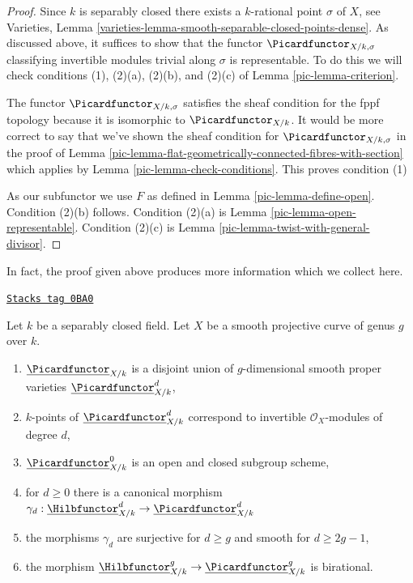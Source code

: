 \begin{proof}

Since $k$ is separably closed there exists a $k$-rational point $\sigma$
of $X$, see
Varieties, Lemma \ref{varieties-lemma-smooth-separable-closed-points-dense}.
As discussed above, it suffices to show that the functor
$\Picardfunctor_{X/k, \sigma}$ classifying invertible modules trivial along
$\sigma$ is representable. To do this we will check conditions (1),
(2)(a), (2)(b), and (2)(c) of
Lemma \ref{pic-lemma-criterion}.

\medskip\noindent
The functor $\Picardfunctor_{X/k, \sigma}$ satisfies the sheaf condition
for the fppf topology because it is isomorphic to $\Picardfunctor_{X/k}$.
It would be more correct to say that we've shown the sheaf condition
for $\Picardfunctor_{X/k, \sigma}$ in the proof of
Lemma \ref{pic-lemma-flat-geometrically-connected-fibres-with-section}
which applies by Lemma \ref{pic-lemma-check-conditions}.
This proves condition (1)

\medskip\noindent
As our subfunctor we use $F$ as defined in Lemma \ref{pic-lemma-define-open}.
Condition (2)(b) follows.
Condition (2)(a) is Lemma \ref{pic-lemma-open-representable}.
Condition (2)(c) is Lemma \ref{pic-lemma-twist-with-general-divisor}.
\end{proof}

In fact, the proof given above produces more information which we
collect here.

\begin{lemma}
\label{pic-lemma-picard-pieces}
\href{https://stacks.math.columbia.edu/tag/0BA0}{\texttt{Stacks tag 0BA0}}

Let $k$ be a separably closed field. Let $X$ be a smooth projective
curve of genus $g$ over $k$.
\begin{enumerate}
\item $\underline{\Picardfunctor}_{X/k}$ is a disjoint union of
$g$-dimensional smooth proper varieties $\underline{\Picardfunctor}^d_{X/k}$,
\item $k$-points of $\underline{\Picardfunctor}^d_{X/k}$
correspond to invertible $\mathcal{O}_X$-modules of degree $d$,
\item $\underline{\Picardfunctor}^0_{X/k}$
is an open and closed subgroup scheme,
\item for $d \geq 0$ there is a canonical morphism
$\gamma_d :
\underline{\Hilbfunctor}^d_{X/k} \to \underline{\Picardfunctor}^d_{X/k}$
\item the morphisms $\gamma_d$
are surjective for $d \geq g$ and smooth for $d \geq 2g - 1$,
\item the morphism
$\underline{\Hilbfunctor}^g_{X/k} \to \underline{\Picardfunctor}^g_{X/k}$
is birational.
\end{enumerate}
\end{lemma}

